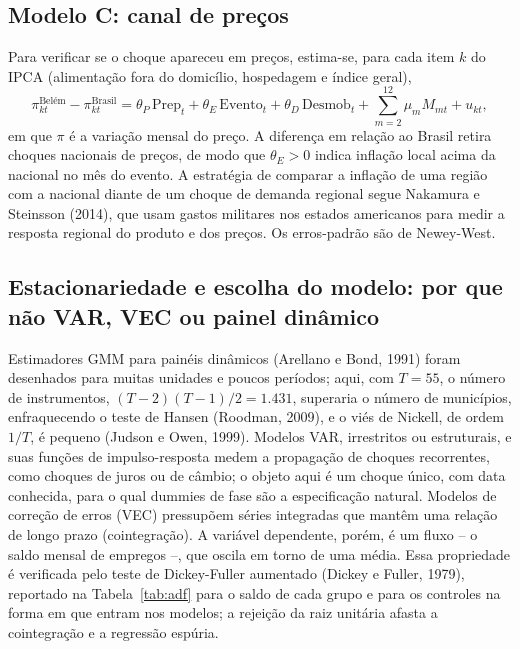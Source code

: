 \documentclass[12pt,a4paper]{article}
\begin{document}
\subsection{Modelo C: canal de preços}

Para verificar se o choque apareceu em preços, estima-se, para cada item $k$ do IPCA (alimentação fora
do domicílio, hospedagem e índice geral),
\begin{equation}
\pi^{\text{Belém}}_{kt} - \pi^{\text{Brasil}}_{kt} = \theta_P\,\text{Prep}_t + \theta_E\,\text{Evento}_t
+ \theta_D\,\text{Desmob}_t + \sum_{m=2}^{12}\mu_m M_{mt} + u_{kt},
\end{equation}
em que $\pi$ é a variação mensal do preço. A diferença em relação ao Brasil retira choques nacionais de
preços, de modo que $\theta_E > 0$ indica inflação local acima da nacional no mês do evento. A
estratégia de comparar a inflação de uma região com a nacional diante de um choque de demanda regional
segue Nakamura e Steinsson (2014), que usam gastos militares nos estados americanos para medir a
resposta regional do produto e dos preços. Os
erros-padrão são de Newey-West.

\subsection{Estacionariedade e escolha do modelo: por que não VAR, VEC ou painel dinâmico}

Estimadores GMM para painéis dinâmicos (Arellano e Bond, 1991) foram desenhados para muitas unidades
e poucos períodos; aqui, com $T = 55$, o número de instrumentos, $(T-2)(T-1)/2 = 1.431$, superaria o
número de municípios, enfraquecendo o teste de Hansen (Roodman, 2009), e o viés de Nickell, de ordem
$1/T$, é pequeno (Judson e Owen, 1999). Modelos VAR, irrestritos ou estruturais, e suas funções de
impulso-resposta medem a propagação de choques recorrentes, como choques de juros ou de câmbio; o objeto
aqui é um choque único, com data conhecida, para o qual dummies de fase são a especificação natural.
Modelos de correção de erros (VEC) pressupõem séries integradas que mantêm uma relação de longo prazo
(cointegração). A variável dependente, porém, é um fluxo -- o saldo mensal de empregos --, que oscila
em torno de uma média. Essa propriedade é verificada pelo teste de Dickey-Fuller aumentado (Dickey e
Fuller, 1979), reportado na Tabela~\ref{tab:adf} para o saldo de cada grupo e para os controles na
forma em que entram nos modelos; a rejeição da raiz unitária afasta a cointegração e a regressão
espúria.
\end{document}
